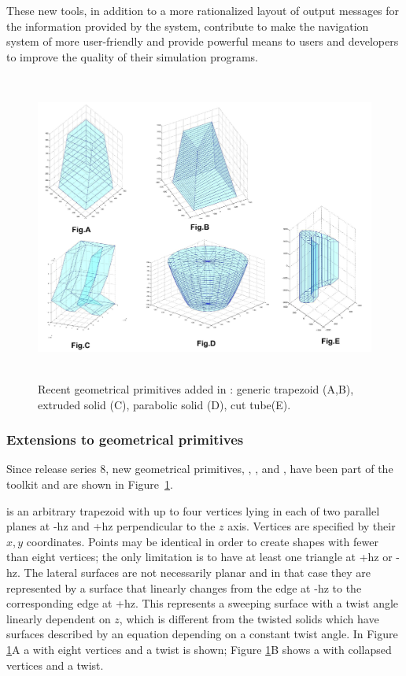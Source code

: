 These new tools, in addition to a more rationalized layout of output messages
for the information provided by the system, contribute to make the navigation
system of \Gfour{} more user-friendly and provide powerful means to users
and developers to improve the quality of their simulation programs.

\begin{figure}
\centering \includegraphics[height=4.0in,width=5.0in]{figures/new_solids.pdf}
\caption{Recent geometrical primitives added in \Gfour{}: generic trapezoid
         (A,B), extruded solid (C), parabolic solid (D), cut tube(E).}
\label{new_solids}
\end{figure}

\subsubsection{Extensions to geometrical primitives}
Since \Gfour{} release series 8, new geometrical primitives, , 
,  and , have been
part of the toolkit and are shown in Figure~\ref{new_solids}.

 is an arbitrary trapezoid with up to four vertices lying
in each of two parallel planes at -hz and +hz perpendicular to the $z$ axis.  
Vertices are specified by their $x,y$ coordinates.  Points may be identical in 
order to create shapes with fewer than eight vertices; the only limitation is to
have at least one triangle at +hz or -hz.  The lateral surfaces are not necessarily 
planar and in that case they are represented by a surface that linearly changes
from the edge at -hz to the corresponding edge at +hz.  This represents a 
sweeping surface with a twist angle linearly dependent on $z$, which is different
from the twisted solids which have surfaces described by an equation depending on
a constant twist angle.  In Figure \ref{new_solids}A a  
with eight vertices and a twist is shown; Figure \ref{new_solids}B shows a
 with collapsed vertices and a twist.

